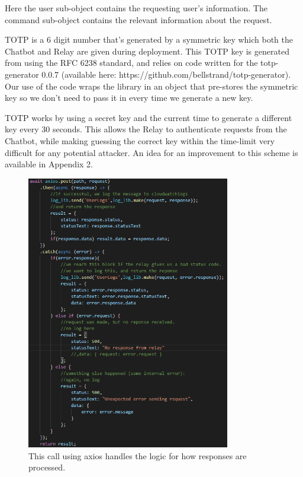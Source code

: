 \documentclass[onecolumn, draftclsnofoot,10pt, compsoc]{IEEEtran}
\begin{document}
    Here the user sub-object contains the requesting user's information.
    The command sub-object contains the relevant information about the request.
    
    TOTP is a 6 digit number that's generated by a symmetric key which both the Chatbot and Relay are given during deployment.
    This TOTP key is generated from using the RFC 6238 standard, and relies on code written for the totp-generator 0.0.7 (available here: https://github.com/bellstrand/totp-generator).
    Our use of the code wraps the library in an object that pre-stores the symmetric key so we don't need to pass it in every time we generate a new key.
    
    TOTP works by using a secret key and the current time to generate a different key every 30 seconds.
    This allows the Relay to authenticate requests from the Chatbot, while making guessing the correct key within the time-limit very difficult for any potential attacker.
    An idea for an improvement to this scheme is available in Appendix 2.
    
    \begin{figure}[ht]
        \centering
        \includegraphics[height=12cm]{code5.png}
        \caption[Sending Request to the Relay]{This call using axios handles the logic for how responses are processed.}
        \label{fig:Sending Request to the Relay}
    \end{figure}
    
\end{document}
